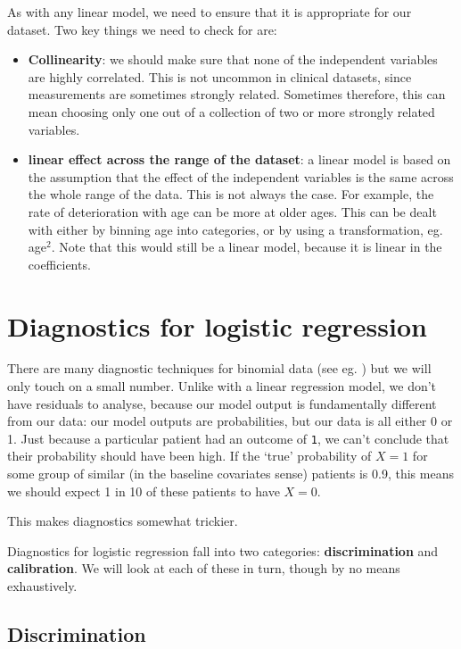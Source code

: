 \documentclass[
  openany]{book}
\providecommand{\tightlist}{%
  \setlength{\itemsep}{0pt}\setlength{\parskip}{0pt}}
\theoremstyle{definition}
\theoremstyle{definition}
\theoremstyle{definition}
\theoremstyle{definition}
\theoremstyle{remark}
\begin{document}
As with any linear model, we need to ensure that it is appropriate for our dataset. Two key things we need to check for are:

\begin{itemize}
\tightlist
\item
  \textbf{Collinearity}: we should make sure that none of the independent variables are highly correlated. This is not uncommon in clinical datasets, since measurements are sometimes strongly related. Sometimes therefore, this can mean choosing only one out of a collection of two or more strongly related variables.
\item
  \textbf{linear effect across the range of the dataset}: a linear model is based on the assumption that the effect of the independent variables is the same across the whole range of the data. This is not always the case. For example, the rate of deterioration with age can be more at older ages. This can be dealt with either by binning age into categories, or by using a transformation, eg. age\(^2\). Note that this would still be a linear model, because it is linear in the coefficients.
\end{itemize}

\hypertarget{diagnostics-for-logistic-regression}{%
\section{Diagnostics for logistic regression}\label{diagnostics-for-logistic-regression}}

There are many diagnostic techniques for binomial data (see eg. \citet{collett_bin}) but we will only touch on a small number. Unlike with a linear regression model, we don't have residuals to analyse, because our model output is fundamentally different from our data: our model outputs are probabilities, but our data is all either 0 or 1. Just because a particular patient had an outcome of \texttt{1}, we can't conclude that their probability should have been high. If the `true' probability of \(X=1\) for some group of similar (in the baseline covariates sense) patients is 0.9, this means we should expect 1 in 10 of these patients to have \(X=0\).

This makes diagnostics somewhat trickier.

Diagnostics for logistic regression fall into two categories: \textbf{discrimination} and \textbf{calibration}. We will look at each of these in turn, though by no means exhaustively.

\hypertarget{discrimination}{%
\subsection{Discrimination}\label{discrimination}}
\end{document}
